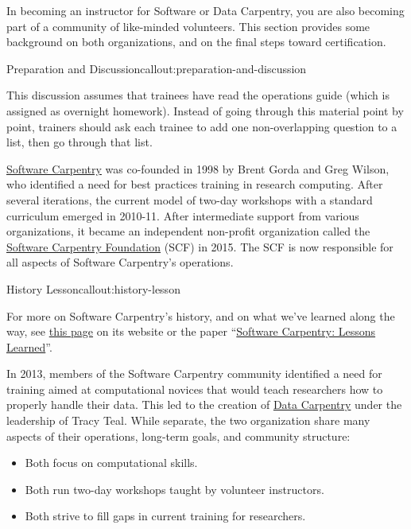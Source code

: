 
In becoming an instructor for Software or Data Carpentry, you are also
becoming part of a community of like-minded volunteers. This section
provides some background on both organizations, and on the final steps
toward certification.

\begin{callout}{Preparation and Discussion}{callout:preparation-and-discussion}

This discussion assumes that trainees have read the operations
guide (which is assigned as overnight homework). Instead of going through this material point by
point, trainers should ask each trainee to add one non-overlapping
question to a list, then go through that list.
\end{callout}


\href{http://software-carpentry.org}{Software Carpentry} was co-founded
in 1998 by Brent Gorda and Greg Wilson, who identified a need for best
practices training in research computing. After several iterations, the
current model of two-day workshops with a standard curriculum emerged in
2010-11. After intermediate support from various organizations, it
became an independent non-profit organization called the
\href{http://software-carpentry.org/scf/}{Software Carpentry Foundation}
(SCF) in 2015. The SCF is now responsible for all aspects of Software
Carpentry's operations.

\begin{callout}{History Lesson}{callout:history-lesson}

For more on Software Carpentry's history, and on what we've learned
along the way, see
\href{http://software-carpentry.org/scf/history/}{this page} on its
website or the paper
``\href{http://f1000research.com/articles/3-62/v2}{Software Carpentry: Lessons Learned}''.
\end{callout}

In 2013, members of the Software Carpentry community identified a need
for training aimed at computational novices that would teach researchers
how to properly handle their data. This led to the creation of
\href{http://datacarpentry.org}{Data Carpentry} under the leadership
of Tracy Teal. While separate, the two organization share many aspects
of their operations, long-term goals, and community structure:

\begin{itemize}
\item
  Both focus on computational skills.
\item
  Both run two-day workshops taught by volunteer instructors.
\item
  Both strive to fill gaps in current training for researchers.
\end{itemize}

